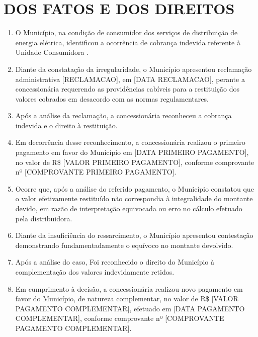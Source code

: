 \newcommand{\tipoRequerimento}{Solicitação de reconhecimento e pagamento de valores complementares decorrentes de cobrança indevida}
\newcommand{\tese}{CORREÇÃO MONETÁRIA E JUROS DE PAGAMENTO}

\section{DOS FATOS E DOS DIREITOS}

\begin{enumerate}[resume]
    \item O Município, na condição de consumidor dos serviços de distribuição de energia elétrica, identificou a ocorrência de cobrança indevida referente à Unidade Consumidora \unidadeConsumidora{}.   

    \item Diante da constatação da irregularidade, o Município apresentou reclamação administrativa [RECLAMACAO], em [DATA RECLAMACAO], perante a concessionária requerendo as providências cabíveis para a restituição dos valores cobrados em desacordo com as normas regulamentares.

    \item Após a análise da reclamação, a concessionária reconheceu a cobrança indevida e o direito à restituição.

    \item Em decorrência desse reconhecimento, a concessionária realizou o primeiro pagamento em favor do Município em [DATA PRIMEIRO PAGAMENTO], no valor de R\$ [VALOR PRIMEIRO PAGAMENTO], conforme comprovante nº [COMPROVANTE PRIMEIRO PAGAMENTO].

    \item Ocorre que, após a análise do referido pagamento, o Município constatou que o valor efetivamente restituído não correspondia à integralidade do montante devido, em razão de interpretação equivocada ou erro no cálculo efetuado pela distribuidora.

    \item Diante da insuficiência do ressarcimento, o Município apresentou contestação demonstrando fundamentadamente o equívoco no montante devolvido.

    \item Após a análise do caso, Foi reconhecido o direito do Município à complementação dos valores indevidamente retidos.

    \item Em cumprimento à decisão, a concessionária realizou novo pagamento em favor do Município, de natureza complementar, no valor de R\$ [VALOR PAGAMENTO COMPLEMENTAR], efetuado em [DATA PAGAMENTO COMPLEMENTAR], conforme comprovante nº [COMPROVANTE PAGAMENTO COMPLEMENTAR].


\end{enumerate}
